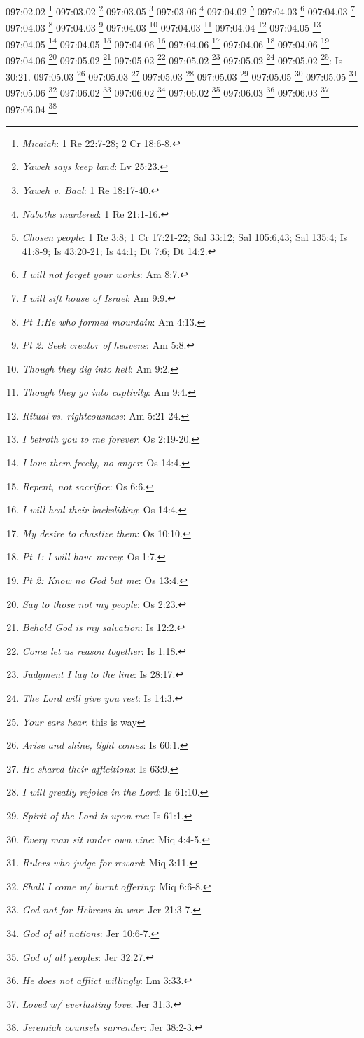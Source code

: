{097:02.02 \footnote{\textit{Micaiah}: 1 Re 22:7-28; 2 Cr 18:6-8.}
097:03.02 \footnote{\textit{Yaweh says keep land}: Lv 25:23.}
097:03.05 \footnote{\textit{Yaweh v. Baal}: 1 Re 18:17-40.}
097:03.06 \footnote{\textit{Naboths murdered}: 1 Re 21:1-16.}
097:04.02 \footnote{\textit{Chosen people}: 1 Re 3:8; 1 Cr 17:21-22; Sal 33:12; Sal 105:6,43; Sal 135:4; Is 41:8-9; Is 43:20-21; Is 44:1; Dt 7:6; Dt 14:2.}
097:04.03 \footnote{\textit{I will not forget your works}: Am 8:7.}
097:04.03 \footnote{\textit{I will sift house of Israel}: Am 9:9.}
097:04.03 \footnote{\textit{Pt 1:He who formed mountain}: Am 4:13.}
097:04.03 \footnote{\textit{Pt 2: Seek creator of heavens}: Am 5:8.}
097:04.03 \footnote{\textit{Though they dig into hell}: Am 9:2.}
097:04.03 \footnote{\textit{Though they go into captivity}: Am 9:4.}
097:04.04 \footnote{\textit{Ritual vs. righteousness}: Am 5:21-24.}
097:04.05 \footnote{\textit{I betroth you to me forever}: Os 2:19-20.}
097:04.05 \footnote{\textit{I love them freely, no anger}: Os 14:4.}
097:04.05 \footnote{\textit{Repent, not sacrifice}: Os 6:6.}
097:04.06 \footnote{\textit{I will heal their backsliding}: Os 14:4.}
097:04.06 \footnote{\textit{My desire to chastize them}: Os 10:10.}
097:04.06 \footnote{\textit{Pt 1: I will have mercy}: Os 1:7.}
097:04.06 \footnote{\textit{Pt 2: Know no God but me}: Os 13:4.}
097:04.06 \footnote{\textit{Say to those not my people}: Os 2:23.}
097:05.02 \footnote{\textit{Behold God is my salvation}: Is 12:2.}
097:05.02 \footnote{\textit{Come let us reason together}: Is 1:18.}
097:05.02 \footnote{\textit{Judgment I lay to the line}: Is 28:17.}
097:05.02 \footnote{\textit{The Lord will give you rest}: Is 14:3.}
097:05.02 \footnote{\textit{Your ears hear}: this is way}: Is 30:21.}
097:05.03 \footnote{\textit{Arise and shine, light comes}: Is 60:1.}
097:05.03 \footnote{\textit{He shared their afflcitions}: Is 63:9.}
097:05.03 \footnote{\textit{I will greatly rejoice in the Lord}: Is 61:10.}
097:05.03 \footnote{\textit{Spirit of the Lord is upon me}: Is 61:1.}
097:05.05 \footnote{\textit{Every man sit under own vine}: Miq 4:4-5.}
097:05.05 \footnote{\textit{Rulers who judge for reward}: Miq 3:11.}
097:05.06 \footnote{\textit{Shall I come w/ burnt offering}: Miq 6:6-8.}
097:06.02 \footnote{\textit{God not for Hebrews in war}: Jer 21:3-7.}
097:06.02 \footnote{\textit{God of all nations}: Jer 10:6-7.}
097:06.02 \footnote{\textit{God of all peoples}: Jer 32:27.}
097:06.03 \footnote{\textit{He does not afflict willingly}: Lm 3:33.}
097:06.03 \footnote{\textit{Loved w/ everlasting love}: Jer 31:3.}
097:06.04 \footnote{\textit{Jeremiah counsels surrender}: Jer 38:2-3.}
